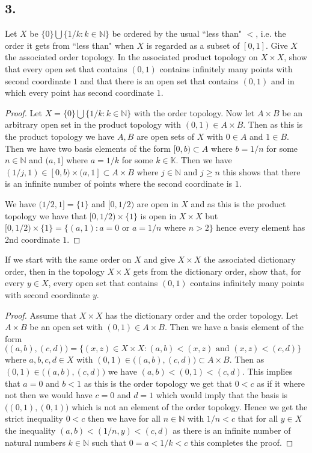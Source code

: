\documentclass{amsart}
\theoremstyle{plain}
\theoremstyle{definition}
\theoremstyle{remark}
\begin{document}
\vspace{.15in}

\noindent
\subsection*{3.} Let $X$ be $\{0\} \bigcup \{ 1/k : k\in \mathbb N \}$ be ordered by the usual ``less than" $<$, i.e. the order it gets from ``less than" when $X$ is regarded as a subset of $[0,1]$. Give $X$ the associated order topology. In the associated product topology on $X\times X$, show that every open set that contains $(0,1)$ contains infinitely many points with second coordinate $1$ and that there is an open set that contains $(0,1)$ and in which every point has second coordinate $1$. 

\begin{proof}
    Let $X= \{0\}\bigcup \{1/k:k\in \mathbb{N}\}$ with the order topology. Now let $A\times B$ be an arbitrary open set in the product topology with $(0,1)\in A\times B$. Then as this is the product topology we have $A,B$ are open sets of $X$ with $0\in A$ and $1\in B$. Then we have two basis elements of the form $[0,b)\subset A$ where $b=1/n$ for some $n\in \mathbb{N}$ and $(a,1]$ where $a=1/k$ for some $k\in \mathbb{K}$. Then we have $(1/j,1)\in [0,b)\times (a,1]\subset A\times B$ where $j\in \mathbb{N}$ and $j\geq n$ this shows that there is an infinite number of points where the second coordinate is $1$. 
    
    We have $(1/2,1]=\{1\}$ and $[0,1/2)$ are open in $X$ and as this is the product topology we have that $[0,1/2)\times \{1\}$ is open in $X\times X$ but $[0,1/2)\times \{1\}=\{(a,1):a=0\text{ or } a=1/n\text{ where }n>2\}$ hence every element has 2nd coordinate $1$.
\end{proof}

If we start with the same order on $X$ and give $X\times X$ the associated dictionary order, then in the topology $X\times X$ gets from the dictionary order, show that, for every $y\in X$, every open set that contains $(0,1)$ contains infinitely many points with second coordinate $y$.

\begin{proof}
    Assume that $X\times X$ has the dictionary order and the order topology. Let $A\times B$ be an open set with $(0,1)\in A\times B$. Then we have a basis element of the form $\big((a,b),(c,d)\big)=\{(x,z)\in X\times X: (a,b)< (x,z)\text{ and }(x,z)<(c,d)\}$ where $a,b,c,d\in X$ with $(0,1)\in \big((a,b),(c,d)\big)\subset A\times B$. Then as $(0,1)\in \big((a,b),(c,d)\big)$ we have $(a,b)<(0,1)<(c,d)$. This implies that $a=0$ and $b<1$ as this is the order topology we get that $0<c$ as if it where not then we would have $c=0$ and $d=1$ which would imply that the basis is $\big((0,1),(0,1)\big)$ which is not an element of the order topology. Hence we get the strict inequality $0<c$ then we have for all $n\in \mathbb{N}$ with $1/n<c$ that for all $y\in X$ the inequality $(a,b)<(1/n,y)<(c,d)$ as there is an infinite number of natural numbers $k\in \mathbb{N}$ such that $0=a<1/k<c$ this completes the proof.



\end{proof}

 
\end{document}
